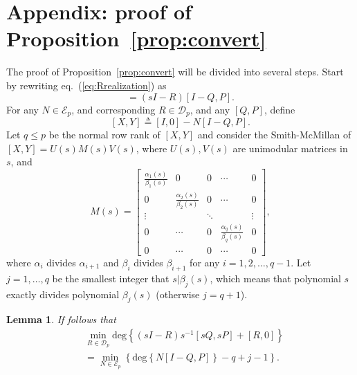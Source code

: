 \documentclass[twocolumn,12pt]{autart}
\theoremstyle{plain}
\newtheorem{lemma}{Lemma}
\begin{document}
\section{Appendix: proof of Proposition~\ref{prop:convert}}\label{se:AppB}
The proof of Proposition~\ref{prop:convert} will be divided into several steps. Start by rewriting eq.~(\ref{eq:Rrealization}) as
\begin{equation}
[sI-W,V]= (s{I}-{R})[I-{Q},{P}].
\end{equation}
For any $N\in\mathcal{E}_p$, and corresponding $R\in\mathcal{D}_p$, and any $[Q,P]$, define
\begin{equation}\label{eq:xy}
[X,Y]\triangleq [I,0]-N[I-Q,P].
\end{equation}
Let $q\le p$ be the normal row rank of $[X,Y]$ and consider the Smith-McMillan of $[X,Y]=U(s)M(s)V(s)$,
where $U(s),V(s)$ are unimodular matrices in $s$, and  
$$M(s)=\begin{bmatrix} 
\frac{\alpha_{1}(s)}{\beta_{1}(s)} & 0 & 0 & \cdots  & 0 \\
0 & \frac{\alpha_{2}(s)}{\beta_{2}(s)} & 0 & \cdots & 0\\
\vdots &  & \ddots & & \vdots\\
0 & \cdots & 0 & \frac{\alpha_{q}(s)}{\beta_{q}(s)} & 0 \\
0 & \cdots & 0 &  \cdots & 0 
\end{bmatrix},$$
where $\alpha_i$ divides $\alpha_{i+1}$ and $\beta_i$ divides $\beta_{i+1}$ for any $i=1,2,\ldots,q-1$. Let $j=1,\ldots,q$ be the smallest integer that $s|\beta_j(s)$, which means that polynomial $s$ exactly divides polynomial $\beta_j(s)$ (otherwise $j=q+1$).

\begin{lemma}\label{lemma1}
If follows that
\begin{align}
&\min_{R\in\mathcal{D}_p} \text{deg}\left\{(s{I}-{R})s^{-1}[s{Q},s{P}]+[{R},{0}]\right\}\nonumber\\
&=\min_{N\in\mathcal{E}_p}  \left \{\text{deg} \left\{N[I-{Q},{P}]\right\}-q+j-1 \right \}.\label{eq:B3}
\end{align}
\end{lemma}
\end{document}
